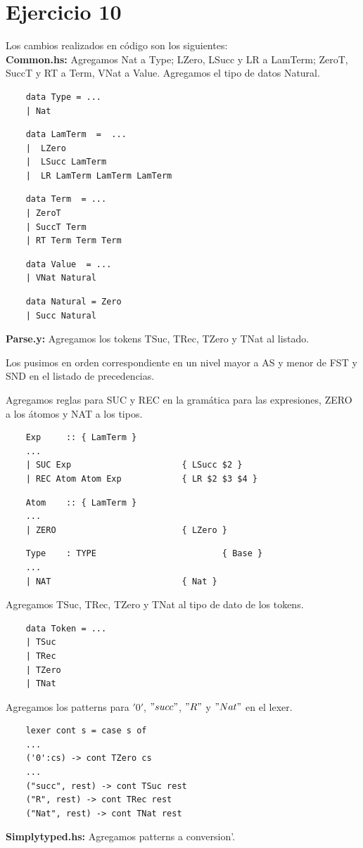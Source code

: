 \documentclass{article}
\begin{document}
	\section*{Ejercicio 10}
	Los cambios realizados en código son los siguientes:\\
	\textbf{Common.hs:} Agregamos Nat a Type; LZero, LSucc y LR a LamTerm; ZeroT, SuccT y RT a Term, VNat a Value. Agregamos el tipo de datos Natural.
	\begin{lstlisting}
	data Type = ...
	| Nat
	\end{lstlisting}
	\begin{lstlisting}
	data LamTerm  =  ...
	|  LZero
	|  LSucc LamTerm
	|  LR LamTerm LamTerm LamTerm
	\end{lstlisting}
	\begin{lstlisting}
	data Term  = ...
	| ZeroT
	| SuccT Term
	| RT Term Term Term
	\end{lstlisting}
	\begin{lstlisting}
	data Value  = ...
	| VNat Natural
	\end{lstlisting}
	\begin{lstlisting}
	data Natural = Zero
	| Succ Natural
	\end{lstlisting}	
	\textbf{Parse.y:} Agregamos los tokens TSuc, TRec, TZero y TNat al listado.	
	
	 Los pusimos en orden correspondiente en un nivel mayor a AS y menor de FST y SND en el listado de precedencias. 
	
	Agregamos reglas para SUC y REC en la gramática para las expresiones, ZERO a los átomos y NAT a los tipos. 	
	\begin{lstlisting}
	Exp     :: { LamTerm }
	...
	| SUC Exp                      { LSucc $2 }
	| REC Atom Atom Exp            { LR $2 $3 $4 }
	\end{lstlisting}
	\begin{lstlisting}
	Atom    :: { LamTerm }
	...
	| ZERO                         { LZero }
	\end{lstlisting}
	\begin{lstlisting}
	Type    : TYPE                         { Base }
	...
	| NAT                          { Nat }
	\end{lstlisting}
	Agregamos TSuc, TRec, TZero y TNat al tipo de dato de los tokens. 
	\begin{lstlisting}
	data Token = ...
	| TSuc
	| TRec
	| TZero
	| TNat
	\end{lstlisting}
	Agregamos los patterns para $'0'$, $"succ"$, $"R"$ y $"Nat"$ en el lexer.
	\begin{lstlisting}
	lexer cont s = case s of
	...
	('0':cs) -> cont TZero cs
	...
	("succ", rest) -> cont TSuc rest
	("R", rest) -> cont TRec rest
	("Nat", rest) -> cont TNat rest
	\end{lstlisting}
	\textbf{Simplytyped.hs:} Agregamos patterns a conversion'.
	
\end{document}
